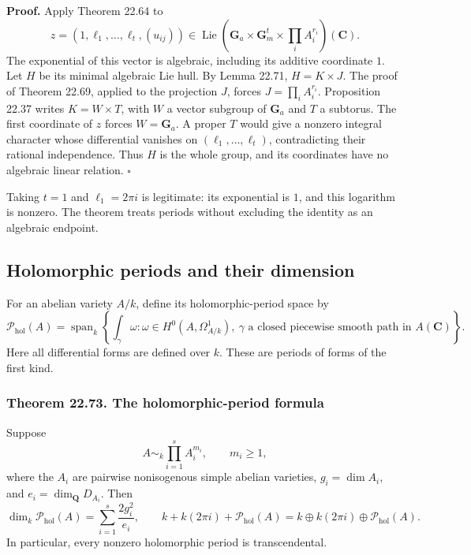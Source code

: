 \documentclass[
  11pt,
  a4paper,
]{article}
\begin{document}
\textbf{Proof.} Apply Theorem 22.64 to \[
 z=(1,\ell_1,\ldots,\ell_t,(u_{ij}))
 \in\operatorname{Lie}\left(
 \mathbf G_a\times\mathbf G_m^t\times\prod_iA_i^{r_i}\right)(\mathbf C).
 \tag{22.178}
\] The exponential of this vector is algebraic, including its additive
coordinate \(1\). Let \(H\) be its minimal algebraic Lie hull. By Lemma
22.71, \(H=K\times J\). The proof of Theorem 22.69, applied to the
projection \(J\), forces \(J=\prod_i A_i^{r_i}\). Proposition 22.37
writes \(K=W\times T\), with \(W\) a vector subgroup of \(\mathbf G_a\)
and \(T\) a subtorus. The first coordinate of \(z\) forces
\(W=\mathbf G_a\). A proper \(T\) would give a nonzero integral
character whose differential vanishes on \((\ell_1,\ldots,\ell_t)\),
contradicting their rational independence. Thus \(H\) is the whole
group, and its coordinates have no algebraic linear relation.
\(\square\)

Taking \(t=1\) and \(\ell_1=2\pi i\) is legitimate: its exponential is
\(1\), and this logarithm is nonzero. The theorem treats periods without
excluding the identity as an algebraic endpoint.

\subsection{Holomorphic periods and their
dimension}\label{holomorphic-periods-and-their-dimension}

For an abelian variety \(A/k\), define its holomorphic-period space by
\[
 \mathcal P_{\mathrm{hol}}(A)
   =\operatorname{span}_k
       \left\{\int_\gamma\omega:
        \omega\in H^0(A,\Omega^1_{A/k}),\
        \gamma\text{ a closed piecewise smooth path in }A(\mathbf C)
       \right\}.
 \tag{22.179}
\] Here all differential forms are defined over \(k\). These are periods
of forms of the first kind.

\subsubsection{Theorem 22.73. The holomorphic-period
formula}\label{theorem-22.73.-the-holomorphic-period-formula}

Suppose \[
 A\sim_k\prod_{i=1}^s A_i^{m_i},\qquad m_i\ge1,
 \tag{22.180}
\] where the \(A_i\) are pairwise nonisogenous simple abelian varieties,
\(g_i=\dim A_i\), and \(e_i=\dim_{\mathbf Q}D_{A_i}\). Then \[
 \dim_k\mathcal P_{\mathrm{hol}}(A)
     =\sum_{i=1}^s\frac{2g_i^2}{e_i},
 \qquad
 k+ k(2\pi i)+\mathcal P_{\mathrm{hol}}(A)
     =k\oplus k(2\pi i)\oplus\mathcal P_{\mathrm{hol}}(A).
 \tag{22.181}
\] In particular, every nonzero holomorphic period is transcendental.
\end{document}
